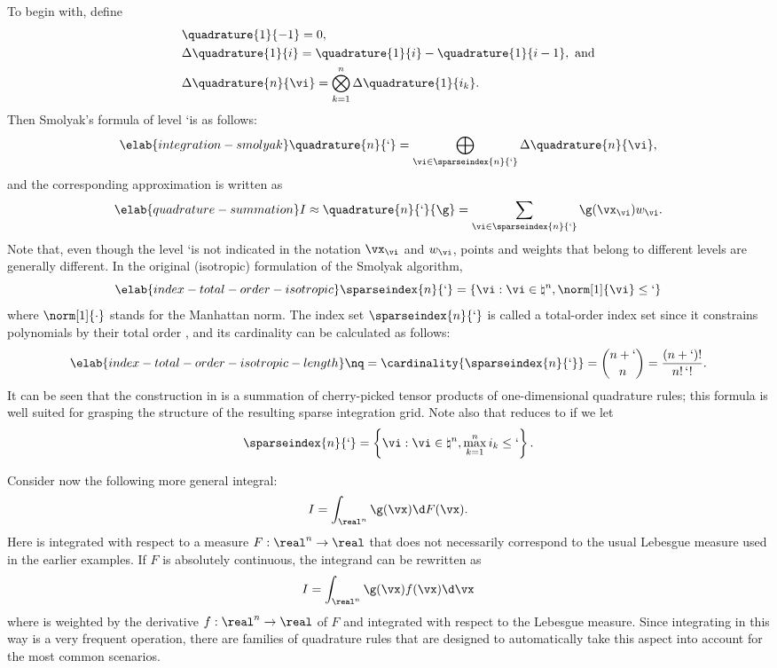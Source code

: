 To begin with, define
\begin{align*}
  & \quadrature{1}{-1} = 0, \\
  & \Delta\quadrature{1}{i} = \quadrature{1}{i} - \quadrature{1}{i - 1}, \text{ and} \\
  & \Delta\quadrature{n}{\vi} = \bigotimes_{k = 1}^n \Delta\quadrature{1}{i_k}.
\end{align*}
Then Smolyak's formula of level \lq is as follows:
\begin{equation} \elab{integration-smolyak}
  \quadrature{n}{\lq} = \bigoplus_{\vi \in \sparseindex{n}{\lq}} \Delta\quadrature{n}{\vi},
\end{equation}
and the corresponding approximation is written as
\begin{equation} \elab{quadrature-summation}
  I \approx \quadrature{n}{\lq}{\g} = \sum_{\vi \in \sparseindex{n}{\lq}} \g(\vx_{\vi}) w_{\vi}.
\end{equation}
Note that, even though the level \lq is not indicated in the notation
$\vx_{\vi}$ and $w_{\vi}$, points and weights that belong to different levels
are generally different. In the original (isotropic) formulation of the Smolyak
algorithm,
\begin{equation} \elab{index-total-order-isotropic}
  \sparseindex{n}{\lq} = \left\{ \vi: \vi \in \natural^n, \norm[1]{\vi} \leq \lq \right\}
\end{equation}
where $\norm[1]{\cdot}$ stands for the Manhattan norm. The index set
$\sparseindex{n}{\lq}$ is called a total-order index set since it constrains
polynomials by their total order \cite{eldred2008, beck2011}, and its
cardinality can be calculated as follows:
\begin{equation} \elab{index-total-order-isotropic-length}
  \nq = \cardinality{\sparseindex{n}{\lq}} = {n + \lq \choose n} = \frac{(n + \lq)!}{n! \, \lq!}.
\end{equation}
It can be seen that the construction in  is a
summation of cherry-picked tensor products of one-dimensional quadrature rules;
this formula is well suited for grasping the structure of the resulting sparse
integration grid. Note also that  reduces to
 if we let
\[
  \sparseindex{n}{\lq} = \left\{ \vi: \vi \in \natural^n, \max_{k = 1}^n i_k \leq \lq \right\}.
\]

Consider now the following more general integral:
\[
  I = \int_{\real^n} \g(\vx) \d F(\vx).
\]
Here \g is integrated with respect to a measure $F: \real^n \to \real$
\cite{durrett2010} that does not necessarily correspond to the usual Lebesgue
measure used in the earlier examples. If $F$ is absolutely continuous, the
integrand can be rewritten as
\[
  I = \int_{\real^n} \g(\vx) f(\vx) \d \vx
\]
where \g is weighted by the derivative $f: \real^n \to \real$ of $F$ and
integrated with respect to the Lebesgue measure. Since integrating in this way
is a very frequent operation, there are families of quadrature rules that are
designed to automatically take this aspect into account for the most common
scenarios.

